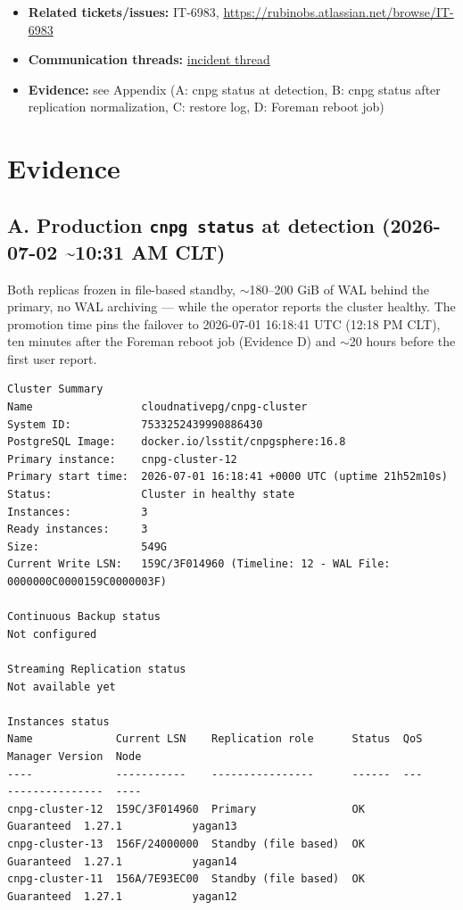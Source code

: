 \documentclass[PMO,authoryear,toc]{lsstdoc}
\begin{document}
\begin{itemize}
  \item \textbf{Related tickets/issues:} IT-6983,
        \url{https://rubinobs.atlassian.net/browse/IT-6983}
  \item \textbf{Communication threads:}
        \href{https://rubin-obs.slack.com/archives/C07RV29CXSR/p1782994199506899}{incident thread}
  \item \textbf{Evidence:} see Appendix (A: cnpg status at detection, B: cnpg
        status after replication normalization, C: restore log, D: Foreman
        reboot job)
\end{itemize}

\appendix

\section{Evidence}

\subsection{A. Production \texttt{cnpg status} at detection (2026-07-02
\textasciitilde10:31 AM CLT)}

Both replicas frozen in file-based standby, $\sim$180--200 GiB of WAL behind
the primary, no WAL archiving --- while the operator reports the cluster
healthy. The promotion time pins the failover to 2026-07-01 16:18:41 UTC
(12:18 PM CLT), ten minutes after the Foreman reboot job (Evidence D) and
$\sim$20 hours before the first user report.

{\footnotesize
\begin{verbatim}
Cluster Summary
Name                 cloudnativepg/cnpg-cluster
System ID:           7533252439990886430
PostgreSQL Image:    docker.io/lsstit/cnpgsphere:16.8
Primary instance:    cnpg-cluster-12
Primary start time:  2026-07-01 16:18:41 +0000 UTC (uptime 21h52m10s)
Status:              Cluster in healthy state
Instances:           3
Ready instances:     3
Size:                549G
Current Write LSN:   159C/3F014960 (Timeline: 12 - WAL File: 0000000C0000159C0000003F)

Continuous Backup status
Not configured

Streaming Replication status
Not available yet

Instances status
Name             Current LSN    Replication role      Status  QoS         Manager Version  Node
----             -----------    ----------------      ------  ---         ---------------  ----
cnpg-cluster-12  159C/3F014960  Primary               OK      Guaranteed  1.27.1           yagan13
cnpg-cluster-13  156F/24000000  Standby (file based)  OK      Guaranteed  1.27.1           yagan14
cnpg-cluster-11  156A/7E93EC00  Standby (file based)  OK      Guaranteed  1.27.1           yagan12
\end{verbatim}
}
\end{document}
